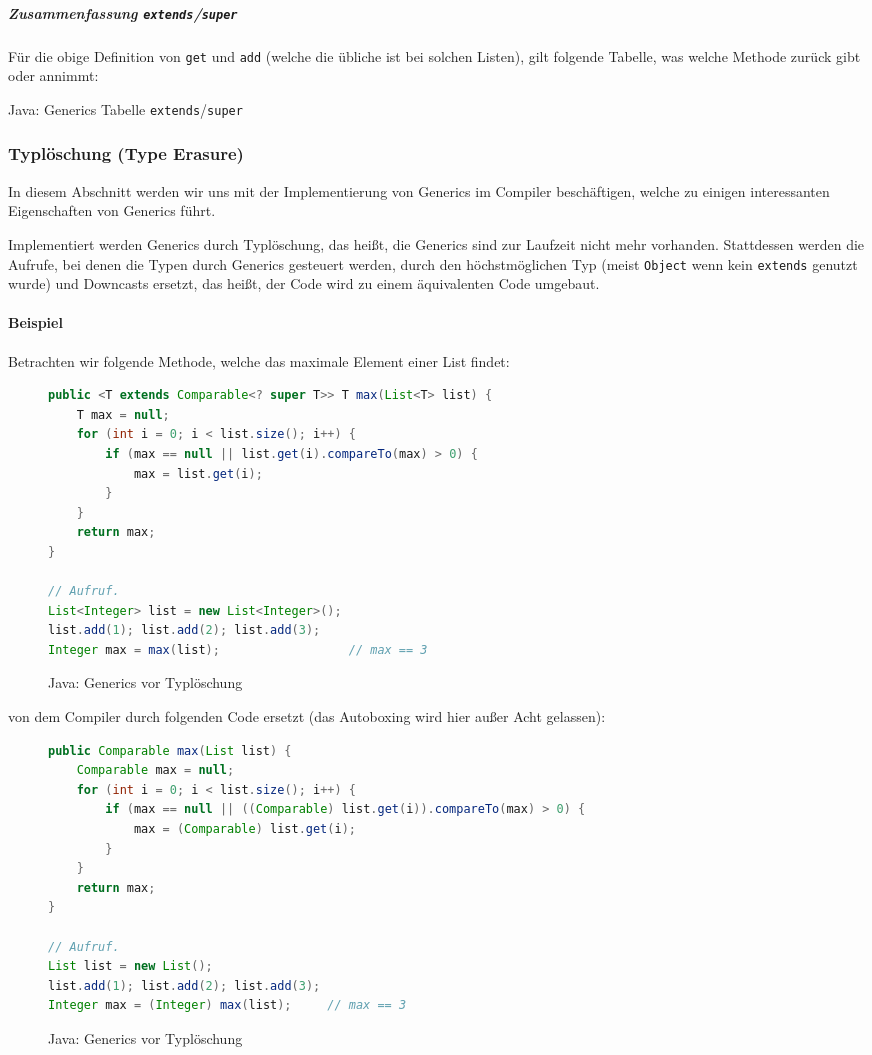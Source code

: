 			\subparagraph{Zusammenfassung \texttt{extends}/\texttt{super}}
				Für die obige Definition von \texttt{get} und \texttt{add} (welche die übliche ist bei solchen Listen), gilt folgende Tabelle, was welche Methode zurück gibt oder annimmt:
				\begin{table}[H]
					\centering
					\caption{Java: Generics Tabelle \texttt{extends}/\texttt{super}}
				\end{table}
	
	\subsubsection{Typlöschung (Type Erasure)}
		In diesem Abschnitt werden wir uns mit der Implementierung von Generics im Compiler beschäftigen, welche zu einigen interessanten Eigenschaften von Generics führt.
		
		Implementiert werden Generics durch Typlöschung, das heißt, die Generics sind zur Laufzeit nicht mehr vorhanden. Stattdessen werden die Aufrufe, bei denen die Typen durch Generics gesteuert werden, durch den höchstmöglichen Typ (meist \texttt{Object} wenn kein \texttt{extends} genutzt wurde) und Downcasts ersetzt, das heißt, der Code wird zu einem äquivalenten Code umgebaut.
		
		\paragraph{Beispiel}
			Betrachten wir folgende Methode, welche das maximale Element einer List findet:
			\begin{figure}[H]
				\centering
				\begin{lstlisting}[language = Java, style = base]
public <T extends Comparable<? super T>> T max(List<T> list) {
	T max = null;
	for (int i = 0; i < list.size(); i++) {
		if (max == null || list.get(i).compareTo(max) > 0) {
			max = list.get(i);
		}
	}
	return max;
}

// Aufruf.
List<Integer> list = new List<Integer>();
list.add(1); list.add(2); list.add(3);
Integer max = max(list);                  // max == 3
				\end{lstlisting}
				\caption{Java: Generics vor Typlöschung}
			\end{figure}
			von dem Compiler durch folgenden Code ersetzt (das Autoboxing wird hier außer Acht gelassen):
			\begin{figure}[H]
				\centering
				\begin{lstlisting}[language = Java, style = base]
public Comparable max(List list) {
	Comparable max = null;
	for (int i = 0; i < list.size(); i++) {
		if (max == null || ((Comparable) list.get(i)).compareTo(max) > 0) {
			max = (Comparable) list.get(i);
		}
	}
	return max;
}

// Aufruf.
List list = new List();
list.add(1); list.add(2); list.add(3);
Integer max = (Integer) max(list);     // max == 3
				\end{lstlisting}
				\caption{Java: Generics vor Typlöschung}
			\end{figure}
	
